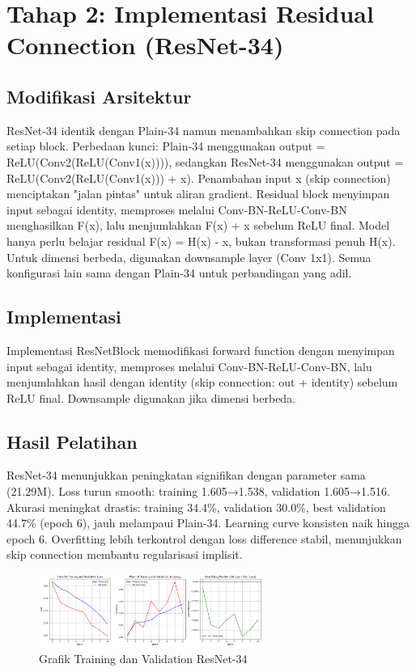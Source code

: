 \documentclass[11pt,a4paper]{article}
\begin{document}
\section{Tahap 2: Implementasi Residual Connection (ResNet-34)}
\subsection{Modifikasi Arsitektur}
ResNet-34 identik dengan Plain-34 namun menambahkan skip connection pada setiap block. Perbedaan kunci: Plain-34 
menggunakan output = ReLU(Conv2(ReLU(Conv1(x)))), sedangkan ResNet-34 menggunakan output = ReLU(Conv2(ReLU(Conv1(x))) + x). 
Penambahan input x (skip connection) menciptakan "jalan pintas" untuk aliran gradient. Residual block menyimpan input sebagai identity, 
memproses melalui Conv-BN-ReLU-Conv-BN menghasilkan F(x), lalu menjumlahkan F(x) + x sebelum ReLU final. Model hanya perlu belajar residual F(x) = H(x) - x, 
bukan transformasi penuh H(x). Untuk dimensi berbeda, digunakan downsample layer (Conv 1x1). Semua konfigurasi lain sama dengan Plain-34 untuk perbandingan yang adil.

\subsection{Implementasi}
Implementasi ResNetBlock memodifikasi forward function dengan menyimpan input sebagai identity, memproses melalui Conv-BN-ReLU-Conv-BN, lalu menjumlahkan hasil dengan identity (skip connection: out + identity) sebelum ReLU final. Downsample digunakan jika dimensi berbeda.

\subsection{Hasil Pelatihan}
ResNet-34 menunjukkan peningkatan signifikan dengan parameter sama (21.29M). Loss turun smooth: training 1.605→1.538, validation 1.605→1.516. Akurasi meningkat drastis: training 34.4\%, validation 30.0\%, best validation 44.7\% (epoch 6), jauh melampaui Plain-34. Learning curve konsisten naik hingga epoch 6. Overfitting lebih terkontrol dengan loss difference stabil, menunjukkan skip connection membantu regularisasi implisit.
\begin{figure}[h]
\centering
\includegraphics[width=0.65\textwidth]{Figure/resnet34.png}
\caption{Grafik Training dan Validation ResNet-34}
\label{fig:resnet34}
\end{figure}
\end{document}
